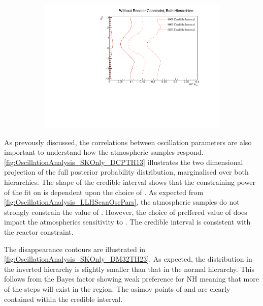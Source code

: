 \begin{figure}[h]
  \begin{subfigure}[t]{1.0\textwidth}
    \includegraphics[width=\textwidth, trim={0mm 0mm 0mm 0mm}, clip,page=1]{Figures/OA/SKOnlyFit/Contours_2D_th13_dcp_BH_0_woRC_UnSmeared_CredibleInterval.pdf}
  \end{subfigure}
  \caption{}
  \label{fig:OscillationAnalysis_SKOnly_DCPTH13}
\end{figure}

As prevously discussed, the correlations between oscillation parameters are also important to understand how the atmospheric samples respond. \autoref{fig:OscillationAnalysis_SKOnly_DCPTH13} illustrates the two dimensional  projection of the full posterior probability distribution, marginalised over both hierarchies. The shape of the \quickmath{1\sigma} credible interval shows that the constraining power of the fit on \dcp is dependent upon the choice of . As expected from \autoref{fig:OscillationAnalysis_LLHScanOscPars}, the atmospheric samples do not strongly constrain the value of . However, the choice of preffered value of  does impact the atmospherics sensitivity to \dcp. The \quickmath{1\sigma} credible interval is consistent with the reactor constraint.

The  disappearance contours are illustrated in \autoref{fig:OscillationAnalysis_SKOnly_DM32TH23}. As expected, the distribution in the inverted hierarchy is slightly smaller than that in the normal hierarchy. This follows from the Bayes factor showing weak preference for NH meaning that more of the steps will exist in the  region. The asimov points of  and  are clearly contained within the \quickmath{1\sigma} credible interval.

